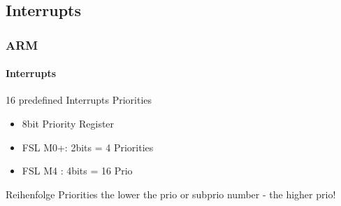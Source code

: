 \subsection{Interrupts}
\begin{frame}
    \frametitle{ARM}
    \framesubtitle{Interrupts}
    16 predefined Interrupts
    Priorities
        \begin{itemize}
        \item 8bit Priority Register
        \item FSL M0+: 2bits = 4 Priorities
        \item FSL M4 : 4bits = 16 Prio
    \end{itemize}
    \begin{block}{Reihenfolge Priorities}
        the lower the prio or subprio number - the higher prio!
    \end{block}
\end{frame}
